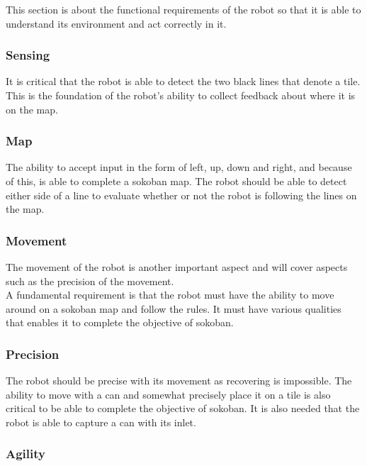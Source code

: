 \documentclass[../../main.tex]{subfiles}
\begin{document}
This section is about the functional requirements of the robot so that it is able to understand its environment and act correctly in it. \\

\subsubsection{Sensing}%
\label{sub:sensing}

It is critical that the robot is able to detect the two black lines that denote a tile. This is the foundation of the robot's ability to collect feedback about where it is on the map.

\subsubsection{Map}%
\label{ssub:map}

The ability to accept input in the form of left, up, down and right, and because of this, is able to complete a sokoban map.
The robot should be able to detect either side of a line to evaluate whether or not the robot is following the lines on the map.

\subsubsection{Movement}%
\label{sub:movement}

The movement of the robot is another important aspect and will cover aspects such as the precision of the movement.\\
A fundamental requirement is that the robot must have the ability to move around on a sokoban map and follow the rules. It must have various qualities that enables it to complete the objective of sokoban.

\subsubsection{Precision}%
\label{ssub:precision}

The robot should be precise with its movement as recovering is impossible.
The ability to move with a can and somewhat precisely place it on a tile is also critical to be able to complete the objective of sokoban. It is also needed that the robot is able to capture a can with its inlet.

\subsubsection{Agility}%
\label{ssub:agility}
\end{document}
